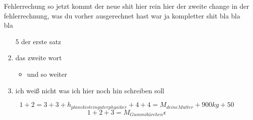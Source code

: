 \documentclass[a4paper]{scrartcl}
\begin{document}
		  
		 Fehlerrechung so jetzt kommt der neue shit hier rein
		 hier der zweite change in der fehlerrechnung, was du vorher ausgerechnet hast war ja kompletter shit
		 bla bla bla
		
		
		
		
		\begin{enumerate}
			\item[5] der erste satz
			\item das zweite wort 
			\begin{itemize}
			\item und so weiter
			\end{itemize}
			\item ich weiß nicht was ich hier noch hin schreiben soll
		\end{enumerate}
	
	 $$1+2=3+3+h_{planck ist ein guter physiker}+4+4=M_{deine Mutter}+900 {kg}+50$$
	 \begin{equation}
	 1+2+3=M_{Gummibärchen}
	  \epsilon
	 \end{equation}
\end{document}
